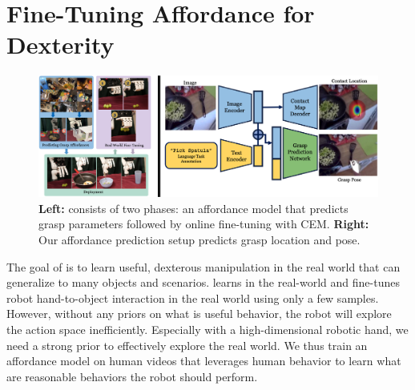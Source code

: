 \chapter{Fine-Tuning Affordance for Dexterity}
\label{sec:method}

\begin{figure}[H]
\centering
\includegraphics[width=\linewidth]{figs/method_overview.pdf}
\vspace{-0.2in}
  \caption{\small \textbf{Left:}  \ours consists of two phases: an affordance model that predicts grasp parameters followed by online fine-tuning with CEM. \textbf{Right:} Our affordance prediction setup predicts grasp location and pose.}
 \label{fig:aff_method}
 \vspace{-0.15in}
\end{figure}

The goal of \ours is to learn useful, dexterous manipulation in the real world that can generalize to many objects and scenarios.  \ours learns in the real-world and fine-tunes robot hand-to-object interaction in the real world using only a few samples. However, without any priors on what is useful behavior, the robot will explore the action space inefficiently. Especially with a high-dimensional robotic hand, we need a strong prior to effectively explore the real world. We thus train an affordance model on human videos that leverages human behavior to learn what are reasonable behaviors the robot should perform.  

